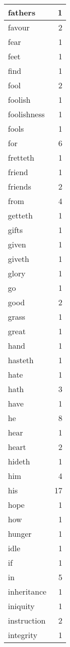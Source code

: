 \begin{center}
\begin{longtable}{l|r}
fathers & 1\\ \hline 
favour & 2\\ \hline 
fear & 1\\ \hline 
feet & 1\\ \hline 
find & 1\\ \hline 
fool & 2\\ \hline 
foolish & 1\\ \hline 
foolishness & 1\\ \hline 
fools & 1\\ \hline 
for & 6\\ \hline 
fretteth & 1\\ \hline 
friend & 1\\ \hline 
friends & 2\\ \hline 
from & 4\\ \hline 
getteth & 1\\ \hline 
gifts & 1\\ \hline 
given & 1\\ \hline 
giveth & 1\\ \hline 
glory & 1\\ \hline 
go & 1\\ \hline 
good & 2\\ \hline 
grass & 1\\ \hline 
great & 1\\ \hline 
hand & 1\\ \hline 
hasteth & 1\\ \hline 
hate & 1\\ \hline 
hath & 3\\ \hline 
have & 1\\ \hline 
he & 8\\ \hline 
hear & 1\\ \hline 
heart & 2\\ \hline 
hideth & 1\\ \hline 
him & 4\\ \hline 
his & 17\\ \hline 
hope & 1\\ \hline 
how & 1\\ \hline 
hunger & 1\\ \hline 
idle & 1\\ \hline 
if & 1\\ \hline 
in & 5\\ \hline 
inheritance & 1\\ \hline 
iniquity & 1\\ \hline 
instruction & 2\\ \hline 
integrity & 1\\ \hline 

\end{longtable}
\end{center}
